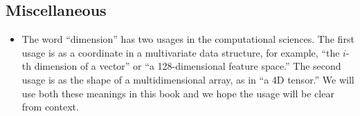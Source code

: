 \subsection*{Miscellaneous}
\begin{itemize}
\item The word ``dimension'' has two usages in the computational sciences. The first usage is as a coordinate in a multivariate data structure, for example, ``the $i$-th dimension of a vector'' or ``a 128-dimensional feature space.'' The second usage is as the shape of a multidimensional array, as in ``a 4D tensor.'' We will use both these meanings in this book and we hope the usage will be clear from context.
\end{itemize}

